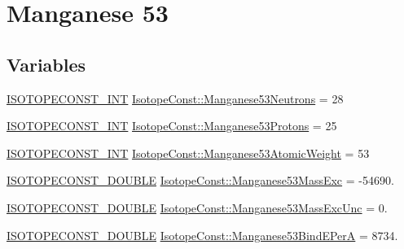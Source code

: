 \hypertarget{group___isotope_const-_manganese-_mn53}{}\section{Manganese 53}
\label{group___isotope_const-_manganese-_mn53}
\subsection*{Variables}
\begin{DoxyCompactItemize}
\item 
\mbox{\hyperlink{group___isotope_const-_macros_ga5f18360b3e99483a35c32d789e62621c}{I\+S\+O\+T\+O\+P\+E\+C\+O\+N\+S\+T\+\_\+\+I\+NT}} \mbox{\hyperlink{group___isotope_const-_manganese-_mn53_gac71f54a1b85dfe084effaa3ac4b37117}{Isotope\+Const\+::\+Manganese53\+Neutrons}} = 28
\item 
\mbox{\hyperlink{group___isotope_const-_macros_ga5f18360b3e99483a35c32d789e62621c}{I\+S\+O\+T\+O\+P\+E\+C\+O\+N\+S\+T\+\_\+\+I\+NT}} \mbox{\hyperlink{group___isotope_const-_manganese-_mn53_ga0e61643cadb8b511577cfd2ed3d0d9f1}{Isotope\+Const\+::\+Manganese53\+Protons}} = 25
\item 
\mbox{\hyperlink{group___isotope_const-_macros_ga5f18360b3e99483a35c32d789e62621c}{I\+S\+O\+T\+O\+P\+E\+C\+O\+N\+S\+T\+\_\+\+I\+NT}} \mbox{\hyperlink{group___isotope_const-_manganese-_mn53_ga3c3a47f01df1acdd0a38b63346dbdff5}{Isotope\+Const\+::\+Manganese53\+Atomic\+Weight}} = 53
\item 
\mbox{\hyperlink{group___isotope_const-_macros_ga8f45a7272ce02c0b4c65c44636ed719a}{I\+S\+O\+T\+O\+P\+E\+C\+O\+N\+S\+T\+\_\+\+D\+O\+U\+B\+LE}} \mbox{\hyperlink{group___isotope_const-_manganese-_mn53_ga938e5413bb553ad8eb5091c8328328c4}{Isotope\+Const\+::\+Manganese53\+Mass\+Exc}} = -\/54690.
\item 
\mbox{\hyperlink{group___isotope_const-_macros_ga8f45a7272ce02c0b4c65c44636ed719a}{I\+S\+O\+T\+O\+P\+E\+C\+O\+N\+S\+T\+\_\+\+D\+O\+U\+B\+LE}} \mbox{\hyperlink{group___isotope_const-_manganese-_mn53_ga9e3ba1771049d81e0f2f1d1b07d18fc6}{Isotope\+Const\+::\+Manganese53\+Mass\+Exc\+Unc}} = 0.
\item 
\mbox{\hyperlink{group___isotope_const-_macros_ga8f45a7272ce02c0b4c65c44636ed719a}{I\+S\+O\+T\+O\+P\+E\+C\+O\+N\+S\+T\+\_\+\+D\+O\+U\+B\+LE}} \mbox{\hyperlink{group___isotope_const-_manganese-_mn53_gae5803c552f37eff89f8eb90205f427aa}{Isotope\+Const\+::\+Manganese53\+Bind\+E\+PerA}} = 8734.
\item 

\end{DoxyCompactItemize}
